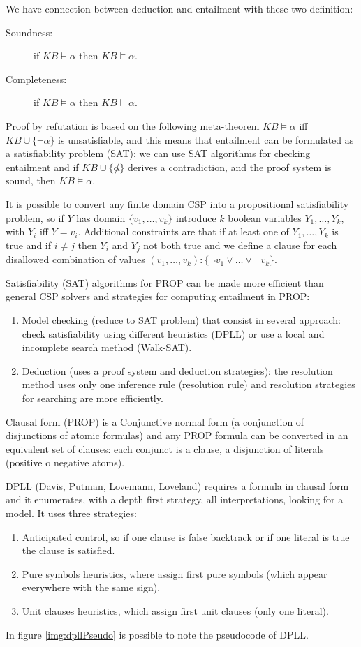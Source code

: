 We have connection between deduction and entailment with these two definition:
\begin{description}
    \item [Soundness: ] if $KB \vdash \alpha$ then $KB \models \alpha$.
    \item [Completeness: ] if $KB \models \alpha$ then $KB \vdash \alpha$.
\end{description}
Proof by refutation is based on the following meta-theorem
$KB \models \alpha$ iff $KB \cup \{\neg \alpha\}$ is unsatisfiable, and this means that
entailment can be formulated as a satisfiability problem (SAT): we can use SAT
algorithms for checking entailment and if $KB \cup \{\not \alpha \}$ derives a 
contradiction, and the proof system is sound, then $KB \models \alpha$.

It is possible to convert any finite domain CSP into a propositional satisfiability
problem, so if $Y$ has domain $\{v_1, \dots, v_k\}$ introduce $k$ boolean variables
$Y_1 , \dots, Y_k$, with $Y_i$ iff $Y = v_i$.\newline
Additional constraints are that if at least one of $Y_1, \dots, Y_k$ is true and 
if $i \neq j$ then $Y_i$ and $Y_j$ not both true and we define a clause for each disallowed
combination of values $(v_1, \dots, v_k): \{\neg v_1 \lor \dots \lor \neg v_k \}$.

Satisfiability (SAT) algorithms for PROP can be made more efficient than general CSP
solvers and strategies for computing entailment in PROP:
\begin{enumerate}
   \item Model checking (reduce to SAT problem) that consist in several approach:
	 check satisfiability using different heuristics (DPLL) or 
	 use a local and incomplete search method (Walk-SAT).
   \item Deduction (uses a proof system and deduction strategies): the resolution method
	   uses only one inference rule (resolution rule) and resolution strategies
         for searching are more efficiently.
\end{enumerate}
Clausal form (PROP) is a Conjunctive normal form (a conjunction of disjunctions
of atomic formulas) and any PROP formula can be converted in an equivalent set of
clauses: each conjunct is a clause, a disjunction of literals (positive o negative atoms).

DPLL (Davis, Putman, Lovemann, Loveland) requires a formula in clausal form and it 
enumerates, with a depth first strategy, all interpretations, looking for a model.\newline
It uses three strategies:
\begin{enumerate}
   \item Anticipated control, so if one clause is false backtrack or if one literal
	 is true the clause is satisfied.
   \item Pure symbols heuristics, where assign first pure symbols (which appear 
	 everywhere with the same sign).
   \item Unit clauses heuristics, which assign first unit clauses (only one literal).
\end{enumerate}
In figure \ref{img:dpllPseudo} is possible to note the pseudocode of DPLL.

